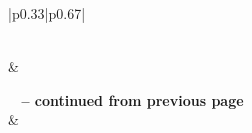 \begin{longtable}{|p{}|p{}|}
	\toprule\noalign{}
	\caption{Fields of Projects}
	\label{tab:fields-meaning}                                                                               \\

	\hline
	 &                              \\
	\hline
	\endfirsthead

	{{\bfseries \tablename\ \thetable{} -- continued from previous page}}                                    \\
	\hline
	 &                              \\
	\hline
	\endhead

	\hline
	                                                           \\ \hline
	\endfoot

	\hline \hline
	\endlastfoot


\end{longtable}
